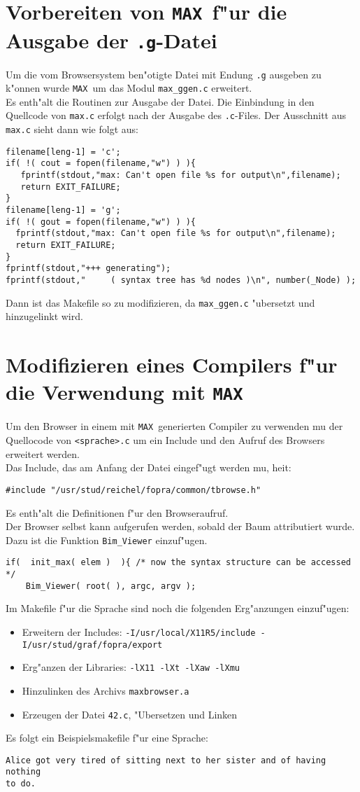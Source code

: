 \newcommand{\MAX}{{\tt MAX }}

\section{Vorbereiten von \MAX f"ur die Ausgabe der {\tt.g}-Datei}
Um die vom Browsersystem ben"otigte Datei mit Endung {\tt .g} ausgeben
zu k"onnen wurde \MAX um das Modul {\tt max\_ggen.c} erweitert.\\
Es enth"alt die Routinen zur Ausgabe der Datei. Die Einbindung in den
Quellcode von {\tt max.c} erfolgt nach der Ausgabe des {\tt .c}-Files.
Der Ausschnitt aus {\tt max.c} sieht dann wie folgt aus:
\begin{verbatim}
filename[leng-1] = 'c';
if( !( cout = fopen(filename,"w") ) ){
   fprintf(stdout,"max: Can't open file %s for output\n",filename);
   return EXIT_FAILURE;
}
filename[leng-1] = 'g';
if( !( gout = fopen(filename,"w") ) ){
  fprintf(stdout,"max: Can't open file %s for output\n",filename);
  return EXIT_FAILURE;
}
fprintf(stdout,"+++ generating");
fprintf(stdout,"     ( syntax tree has %d nodes )\n", number(_Node) );
\end{verbatim}
Dann ist das Makefile so zu modifizieren, da\3 {\tt max\_ggen.c} 
"ubersetzt und hinzugelinkt wird.
%
%
%
\section{Modifizieren eines Compilers f"ur die Verwendung mit \MAX}
Um den Browser in einem mit \MAX generierten Compiler zu verwenden
mu\3 der Quellocode von {\tt <sprache>.c} um ein Include und den
Aufruf des Browsers erweitert werden.\\
Das Include, das am Anfang der Datei eingef"ugt werden mu\3, hei\3t:
\begin{verbatim}
#include "/usr/stud/reichel/fopra/common/tbrowse.h"
\end{verbatim}
Es enth"alt die Definitionen f"ur den Browseraufruf.\\
Der Browser selbst kann aufgerufen werden, sobald der Baum attributiert
wurde. Dazu ist die Funktion {\tt Bim\_Viewer} einzuf"ugen.
\begin{verbatim}
if(  init_max( elem )  ){ /* now the syntax structure can be accessed  */
    Bim_Viewer( root( ), argc, argv );
\end{verbatim}
Im Makefile f"ur die Sprache sind noch die folgenden Erg"anzungen
einzuf"ugen:\\
\begin{itemize}
\item Erweitern der Includes: {\tt -I/usr/local/X11R5/include  -I/usr/stud/graf/fopra/export}
\item Erg"anzen der Libraries: {\tt -lX11 -lXt -lXaw -lXmu}
\item Hinzulinken des Archivs {\tt maxbrowser.a}
\item Erzeugen der Datei {\tt 42.c}, "Ubersetzen und Linken
\end{itemize}

Es folgt ein Beispielsmakefile f"ur eine Sprache:
\begin{verbatim}
Alice got very tired of sitting next to her sister and of having nothing
to do.
\end{verbatim}
